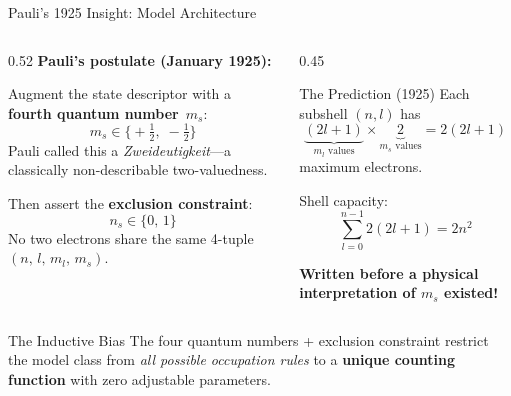 \documentclass[aspectratio=169,12pt]{beamer}
\begin{document}
\begin{frame}[shrink=40]{Pauli's 1925 Insight: Model Architecture}

\begin{columns}[T]
\begin{column}{0.52\textwidth}
\textbf{Pauli's postulate (January 1925):}

\bigskip
Augment the state descriptor with a
\textbf{fourth quantum number}~$m_s$:
\[
  m_s \in \bigl\{+\tfrac{1}{2},\;-\tfrac{1}{2}\bigr\}
\]
Pauli called this a \emph{Zweideutigkeit}---a
classically non-describable two-valuedness.

\bigskip
Then assert the \textbf{exclusion constraint}:
\[
  \boxed{n_s \in \{0,\,1\}}
\]
No two electrons share the same 4-tuple
$(n,\,l,\,m_l,\,m_s)$.
\end{column}
\begin{column}{0.45\textwidth}
\begin{alertblock}{The Prediction (1925)}
Each subshell $(n,l)$ has
\[
  \underbrace{(2l+1)}_{m_l\text{ values}}
  \times
  \underbrace{2}_{m_s\text{ values}}
  = 2(2l+1)
\]
maximum electrons.

\medskip
Shell capacity:
\[
  \sum_{l=0}^{n-1}2(2l+1) = 2n^2
\]

\medskip
\textbf{Written before a physical
interpretation of $m_s$ existed!}
\end{alertblock}
\end{column}
\end{columns}

\bigskip
\begin{block}{The Inductive Bias}
The four quantum numbers + exclusion constraint restrict the model class from
\emph{all possible occupation rules} to a \textbf{unique counting function} with
zero adjustable parameters.
\end{block}

\end{frame}
\end{document}
